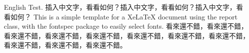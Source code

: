 \documentclass[12pt, a4paper]{report}
\begin{document}
English Test. 插入中文字，看看如何？插入中文字，看看如何？插入中文字，看看如何？ This is a simple template for a
XeLaTeX document using the report class, with the fontspec package to
easily select fonts. 看來還不錯，看來還不錯，看來還不錯，看來還不錯，看來還不錯，看來還不錯，看來還不錯，看來還不錯，看來還不錯，看來還不錯，看來還不錯。
\end{document}
